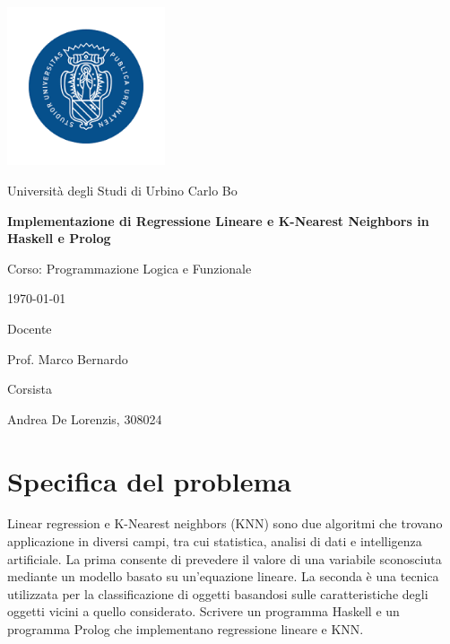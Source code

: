 \documentclass[11pt]{article}
\newcommand{\titlestr}{Implementazione di Regressione Lineare e K-Nearest Neighbors in Haskell e Prolog}
\newcommand{\subtitlestr}{Corso: Programmazione Logica e Funzionale}
\newcommand{\labelStudente}{Corsista}
\newcommand{\labelDocente}{Docente}
\newcommand{\authorstr}{Andrea De Lorenzis, 308024}
\newcommand{\profstr}{Prof. Marco Bernardo}
\theoremstyle{definition}
\begin{document}
\begin{titlepage}
  \centering
  \includegraphics[width=0.35\textwidth]{imgs/logo_uniurb.png}
  \centerline {\small Università degli Studi di Urbino Carlo Bo}
  
    \vspace{1cm}
  {\LARGE \bf{\titlestr} \par}
  {\vspace{0.5cm}}
  {\Large \subtitlestr \par}
  \vspace{0.5cm}
   {\large \today}    
  \vspace{1.5cm}
  
  \begin{multicols}{2}
  \flushleft
  {\Large \labelDocente \par}
  {\vspace{0.2cm}}
  {\Large \profstr \par}
  {\vspace{1.5cm}}  
   \flushright
  {\Large \labelStudente \par}
  {\vspace{0.2cm}}
  { \Large\authorstr \par}
  \end{multicols}

  \vfill
\end{titlepage}

\newpage

{
  \hypersetup{linkcolor=black}
  \tableofcontents
}

\newpage

\section{Specifica del problema}
Linear regression e K-Nearest neighbors (KNN) sono due algoritmi che trovano applicazione in diversi campi, tra cui statistica, analisi di dati e intelligenza artificiale. La prima consente di prevedere il valore di una variabile sconosciuta mediante un modello basato su un'equazione lineare. La seconda è una tecnica utilizzata per la classificazione di oggetti basandosi sulle caratteristiche degli oggetti vicini a quello considerato. Scrivere un programma Haskell e un programma Prolog che implementano regressione lineare e KNN.  
\end{document}
